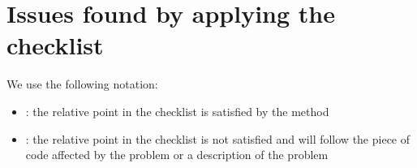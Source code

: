 \section{Issues found by applying the checklist}
We use the following notation:
\begin{itemize}
	\item \cmark: the relative point in the checklist is satisfied by the method
	\item \xmark: the relative point in the checklist is not satisfied and will follow the piece of code affected
	by the problem or a description of the problem
\end{itemize}





















